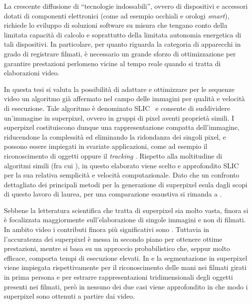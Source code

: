 \documentclass[12pt,a4paper,oneside]{article}
\begin{document}
La crescente diffusione di ``tecnologie indossabili'', ovvero di dispositivi e accessori dotati di componenti elettronici (come ad esempio occhiali e orologi \textit{smart}), richiede lo sviluppo di soluzioni software su misura che tengano conto della limitata capacità di calcolo e soprattutto della limitata autonomia energetica di tali dispositivi. In particolare, per quanto riguarda la categoria di apparecchi in grado di registrare filmati, è necessario un grande sforzo di ottimizzazione per garantire prestazioni perlomeno vicine al tempo reale quando si tratta di elaborazioni video.

In questa tesi si valuta la possibilità di adattare e ottimizzare per le sequenze video un algoritmo \cite{ACHANTA_SLIC} già affermato nel campo delle immagini per qualità e velocità di esecuzione. Tale algoritmo è denominato \acrshort{SLIC}~\cite{ACHANTA_SLIC} e consente di suddividere un'immagine in superpixel, ovvero in gruppi di pixel aventi proprietà simili. I superpixel costituiscono dunque una rappresentazione compatta dell'immagine, riducendone la complessità ed eliminando la ridondanza dei singoli pixel, e possono essere impiegati in svariate applicazioni, come ad esempio il riconoscimento di oggetti \cite{OBJECT_LOCALIZATION} oppure il \textit{tracking} \cite{TRACKING}. Rispetto alla moltitudine di algoritmi simili (fra cui \cite{GENERATIVE_PIETRO,COMANICIU_MEAN_SHIFT,MALIK_NORMALIZED_CUTS,FELZENSZWALB_GRAPH,GRID_SEAMS}), in questo elaborato viene scelto e approfondito \acrshort{SLIC}~\cite{ACHANTA_SLIC} per la sua relativa semplicità e velocità computazionale. Dato che un confronto dettagliato dei principali metodi per la generazione di superpixel esula dagli scopi di questo lavoro di laurea, per una comparazione esaustiva si rimanda a \cite{ACHANTA_SLIC}.

Sebbene la letteratura scientifica che tratta di superpixel sia molto vasta, finora si è focalizzata maggiormente sull'elaborazione di singole immagini e non di filmati. In ambito video i contributi finora più significativi sono \cite{DRUCKER_FAST_SUPERPIXELS_VIDEO,CHANG_TEMPORAL_SUPERPIXELS}. Tuttavia in \cite{DRUCKER_FAST_SUPERPIXELS_VIDEO} l'accuratezza dei superpixel è messa in secondo piano per ottenere ottime prestazioni, mentre \cite{CHANG_TEMPORAL_SUPERPIXELS} si basa su un approccio probabilistico che, seppur molto efficace, comporta tempi di esecuzione elevati. In \cite{SERRA_HAND_RECOGNITION} e \cite{VIDEOTRACE} la segmentazione in superpixel viene impiegata rispettivamente per il riconoscimento delle mani nei filmati girati in prima persona e per estrarre rappresentazioni tridimensionali degli oggetti presenti nei filmati, però in nessuno dei due casi viene approfondito in che modo i superpixel sono ottenuti a partire dai video.
\end{document}
